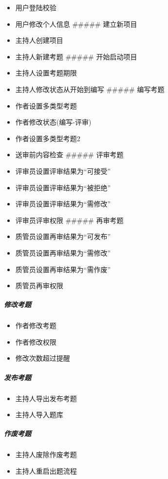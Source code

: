 \documentclass[hyperref, a4paper]{ctexart}
\providecommand{\tightlist}{%
  \setlength{\itemsep}{0pt}\setlength{\parskip}{0pt}}
\let\oldsubparagraph\subparagraph
\renewcommand{\subparagraph}[1]{\oldsubparagraph{#1}\mbox{}}
\begin{document}
\begin{itemize}
\tightlist
\item
  用户登陆校验
\item
  用户修改个人信息 \#\#\#\#\# 建立新项目
\item
  主持人创建项目
\item
  主持人新建考题 \#\#\#\#\# 开始启动项目
\item
  主持人设置考题期限
\item
  主持人修改状态从开始到编写 \#\#\#\#\# 编写考题
\item
  作者设置多类型考题
\item
  作者修改状态(编写-评审)
\item
  作者设置多类型考题2
\item
  送审前内容检查 \#\#\#\#\# 评审考题
\item
  评审员设置评审结果为``可接受''
\item
  评审员设置评审结果为``被拒绝''
\item
  评审员设置评审结果为``需修改''
\item
  评审员评审权限 \#\#\#\#\# 再审考题
\item
  质管员设置再审结果为``可发布''
\item
  质管员设置再审结果为``需修改''
\item
  质管员设置再审结果为``需作废''
\item
  质管员再审权限
\end{itemize}

\hypertarget{ux4feeux6539ux8003ux9898}{%
\subparagraph{修改考题}\label{ux4feeux6539ux8003ux9898}}

\begin{itemize}
\tightlist
\item
  作者修改考题
\item
  作者修改权限
\item
  修改次数超过提醒
\end{itemize}

\hypertarget{ux53d1ux5e03ux8003ux9898}{%
\subparagraph{发布考题}\label{ux53d1ux5e03ux8003ux9898}}

\begin{itemize}
\tightlist
\item
  主持人导出发布考题
\item
  主持人导入题库
\end{itemize}

\hypertarget{ux4f5cux5e9fux8003ux9898}{%
\subparagraph{作废考题}\label{ux4f5cux5e9fux8003ux9898}}

\begin{itemize}
\tightlist
\item
  主持人废除作废考题
\item
  主持人重启出题流程
\end{itemize}
\end{document}
